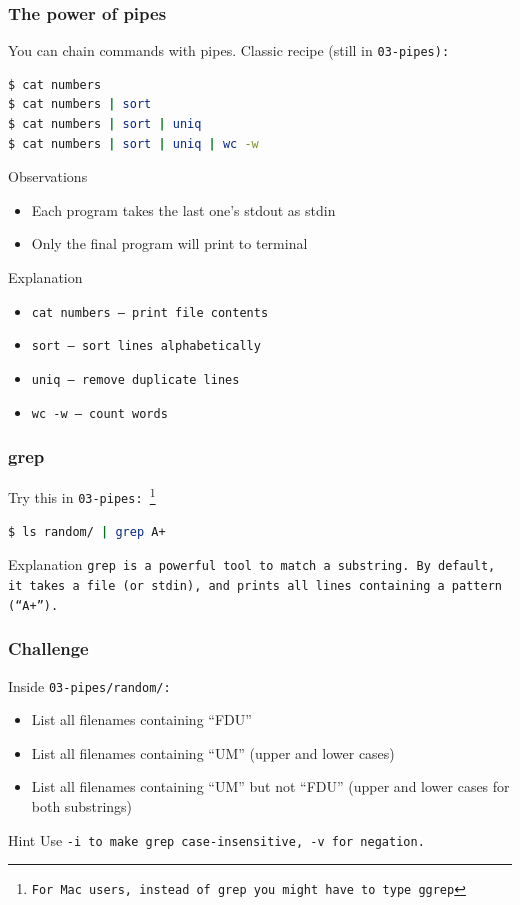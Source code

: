 \begin{frame}[fragile]
\frametitle{The power of pipes}
You can chain commands with pipes. Classic recipe (still in \tt{03-pipes}):
\begin{lstlisting}[language=bash]
$ cat numbers
$ cat numbers | sort
$ cat numbers | sort | uniq
$ cat numbers | sort | uniq | wc -w
\end{lstlisting}
\pause
\begin{block}{Observations}
    \begin{itemize}
        \item Each program takes the last one's stdout as stdin
        \item Only the final program will print to terminal
    \end{itemize}
\end{block}
\begin{block}{Explanation}
    \begin{itemize}
        \item \tt{cat numbers} — print file contents
        \item \tt{sort} — sort lines alphabetically
        \item \tt{uniq} — remove duplicate lines
        \item \tt{wc -w} — count words
    \end{itemize}
\end{block}
\end{frame}

\begin{frame}[fragile]
\frametitle{grep}
Try this in \tt{03-pipes}:
\footnote{For Mac users, instead of \tt{grep} you might have to type \tt{ggrep}}
\begin{lstlisting}[language=bash]
$ ls random/ | grep A+
\end{lstlisting}
\pause
\begin{block}{Explanation}
    \tt{grep} is a powerful tool to match a substring. By default, it takes
    a file (or stdin), and prints all lines containing a pattern (``A+'').
\end{block}
\end{frame}

\begin{frame}
\frametitle{Challenge}
Inside \tt{03-pipes/random/}:
\begin{itemize}
    \item List all filenames containing ``FDU''
    \item List all filenames containing ``UM'' (upper and lower cases)
    \item List all filenames containing ``UM'' but not ``FDU''
        (upper and lower cases for both substrings)
\end{itemize}
\begin{block}{Hint}
    Use \tt{-i} to make \tt{grep} case-insensitive, \tt{-v} for negation.
\end{block}
\end{frame}

